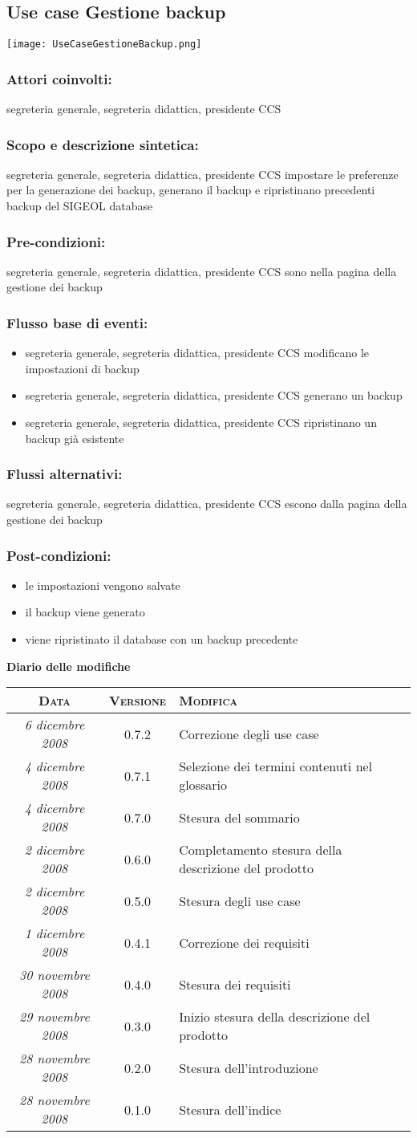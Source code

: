 \documentclass[11pt,a4paper]{article}
\newcommand{\modifiche} 
{
\newpage
\begin{center}
\textbf{Diario delle modifiche} \\
\bigskip
\begin{tabular}{|c|c|p{0.51\textwidth}|}
\hline
\textsc{Data} & \textsc{Versione} & \textsc{Modifica} \\
\hline
\hline
\textit{6 dicembre 2008} & 0.7.2 & Correzione degli use case \\
\hline
\textit{4 dicembre 2008} & 0.7.1 & Selezione dei termini contenuti nel glossario \\
\hline
\textit{4 dicembre 2008} & 0.7.0 & Stesura del sommario \\
\hline
\textit{2 dicembre 2008} & 0.6.0 & Completamento stesura della descrizione del prodotto \\
\hline
\textit{2 dicembre 2008} & 0.5.0 & Stesura degli use case \\
\hline
\textit{1 dicembre 2008} & 0.4.1 & Correzione dei requisiti \\
\hline
\textit{30 novembre 2008} & 0.4.0 & Stesura dei requisiti \\
\hline
\textit{29 novembre 2008} & 0.3.0 & Inizio stesura della descrizione del prodotto \\
\hline
\textit{28 novembre 2008} & 0.2.0 & Stesura dell'introduzione \\
\hline
\textit{28 novembre 2008} & 0.1.0 & Stesura dell'indice \\
\hline
\end{tabular}
\end{center}
}
\begin{document}
\subsection{Use case Gestione backup}
\begin{center} 
 \texttt{[image: UseCaseGestioneBackup.png]}
\end{center}
\subsubsection*{Attori coinvolti:}
segreteria generale, segreteria didattica, presidente CCS
\subsubsection*{Scopo e descrizione sintetica:}
segreteria generale, segreteria didattica, presidente CCS impostare le preferenze per la generazione dei backup, generano il backup e ripristinano precedenti backup del SIGEOL database
\subsubsection*{Pre-condizioni:}
segreteria generale, segreteria didattica, presidente CCS sono nella pagina della gestione dei backup
\subsubsection*{Flusso base di eventi:}
\begin{itemize}
 \item segreteria generale, segreteria didattica, presidente CCS modificano le impostazioni di backup
 \item segreteria generale, segreteria didattica, presidente CCS generano un backup
 \item segreteria generale, segreteria didattica, presidente CCS ripristinano un backup già esistente
\end{itemize}
\subsubsection*{Flussi alternativi:}
segreteria generale, segreteria didattica, presidente CCS escono dalla pagina della gestione dei backup
\subsubsection*{Post-condizioni:}
\begin{itemize}
\item le impostazioni vengono salvate
\item il backup viene generato
\item viene ripristinato il database con un backup precedente
\end{itemize}

\modifiche
\end{document}

